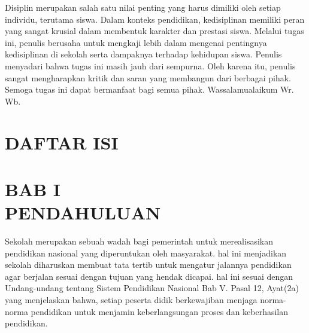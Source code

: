 \documentclass[f4paper,12pt, left=3cm,right=2cm,bottom=2cm, bahasa]{article}
\begin{document}
Disiplin merupakan salah satu nilai penting yang harus dimiliki oleh setiap individu, terutama siswa. Dalam konteks pendidikan, kedisiplinan memiliki peran yang sangat krusial dalam membentuk karakter dan prestasi siswa. Melalui tugas ini, penulis berusaha untuk mengkaji lebih dalam mengenai pentingnya kedisiplinan di sekolah serta dampaknya terhadap kehidupan siswa. Penulis menyadari bahwa tugas ini masih jauh dari sempurna. Oleh karena itu, penulis sangat mengharapkan kritik dan saran yang membangun dari berbagai pihak. Semoga tugas ini dapat bermanfaat bagi semua pihak. Wassalamualaikum Wr. Wb.\\
    
\vspace{3cm}
\pagebreak

    \section*{DAFTAR ISI}
\renewcommand{\cftdot}{.}
\tableofcontents




\pagebreak
{}
\setcounter{page}{1}
\setcounter{section}{1}


\section*{BAB I \\PENDAHULUAN}
Sekolah merupakan sebuah wadah bagi pemerintah untuk merealisasikan pendidikan nasional yang diperuntukan oleh masyarakat.
hal ini menjadikan sekolah diharuskan membuat tata tertib untuk mengatur jalannya pendidikan agar berjalan sesuai dengan tujuan yang hendak dicapai. hal ini sesuai dengan Undang-undang tentang Sistem Pendidikan Nasional Bab V. Pasal 12, Ayat(2a) yang menjelaskan bahwa, setiap peserta didik berkewajiban menjaga norma-norma pendidikan untuk menjamin keberlangsungan proses dan keberhasilan pendidikan.
\end{document}
